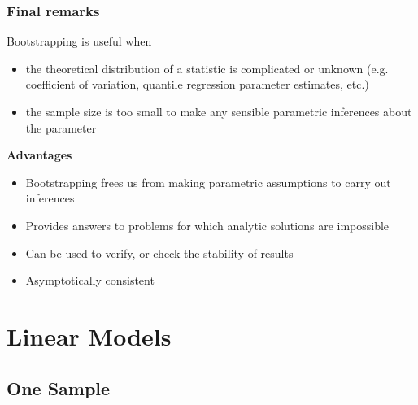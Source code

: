 \documentclass[a4paper]{article}\usepackage[]{graphicx}\usepackage[]{xcolor}
\begin{document}
\subsubsection{Final remarks}
Bootstrapping is useful when
\begin{itemize}
	\item the theoretical distribution of a statistic is complicated or unknown (e.g. coefficient of variation, quantile regression parameter estimates, etc.)
	\item the sample size is too small to make any sensible parametric inferences about the parameter
\end{itemize}
\textbf{Advantages}
\begin{itemize}
	\item Bootstrapping frees us from making parametric assumptions to carry out inferences
	\item Provides answers to problems for which analytic solutions are impossible
	\item Can be used to verify, or check the stability of results
	\item Asymptotically consistent
\end{itemize}
\section{Linear Models}\label{sec:18}
\subsection{One Sample}
\end{document}
